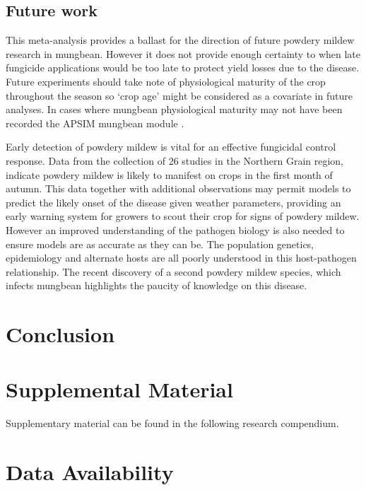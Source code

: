 \documentclass[agronomy,article,submit,moreauthors,pdftex]{mdpi}
\begin{document}
\hypertarget{future-work}{%
\subsection{Future work}\label{future-work}}

This meta-analysis provides a ballast for the direction of future
powdery mildew research in mungbean. However it does not provide enough
certainty to when late fungicide applications would be too late to
protect yield losses due to the disease. Future experiments should take
note of physiological maturity of the crop throughout the season so
`crop age' might be considered as a covariate in future analyses. In
cases where mungbean physiological maturity may not have been recorded
the APSIM mungbean module \citep{RobertsonAPSIMlegume2002}.

Early detection of powdery mildew is vital for an effective fungicidal
control response. Data from the collection of 26 studies in the Northern
Grain region, indicate powdery mildew is likely to manifest on crops in
the first month of autumn. This data together with additional
observations may permit models to predict the likely onset of the
disease given weather parameters, providing an early warning system for
growers to scout their crop for signs of powdery mildew. However an
improved understanding of the pathogen biology is also needed to ensure
models are as accurate as they can be. The population genetics,
epidemiology and alternate hosts are all poorly understood in this
host-pathogen relationship. The recent discovery of a second powdery
mildew species, which infects mungbean highlights the paucity of
knowledge on this disease.

\hypertarget{conclusion}{%
\section{Conclusion}\label{conclusion}}

\hypertarget{supplemental-material}{%
\section{Supplemental Material}\label{supplemental-material}}

Supplementary material can be found in the following research
compendium.

\hypertarget{data-availability}{%
\section{Data Availability}\label{data-availability}}
\end{document}
